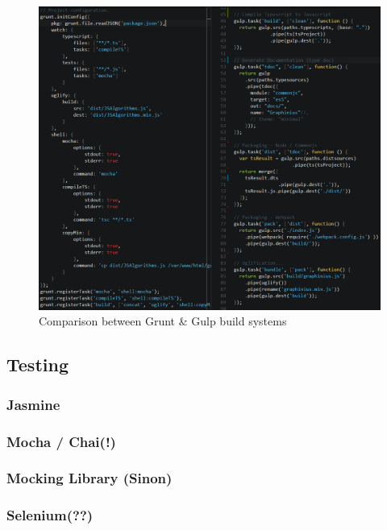 		
		\begin{figure}[ht]
			\label{fig_grunt_gulp}
			\centering
			\hspace*{-1.4cm}
			\includegraphics[width=1.2\textwidth]{figures/grunt_gulp_comparison}
			\caption{Comparison between Grunt \& Gulp build systems}
		\end{figure}
		
	
	\subsection{Testing}
	\label{ssect:testing}
	
		\subsubsection{Jasmine}
		\label{sssect:jasmine}
		
		\subsubsection{Mocha / Chai(!)}
		\label{sssect:mocha_chai}
		
		\subsubsection{Mocking Library (Sinon)}
		\label{sssect:mocking}

		\subsubsection{Selenium(??)}
		\label{sssect:selenium}

